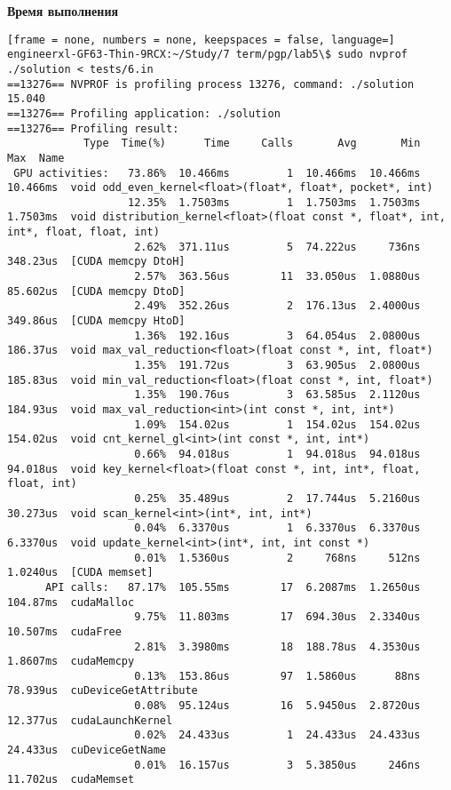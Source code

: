 {\bfseries Время выполнения}
\begin{lstlisting}[frame = none, numbers = none, keepspaces = false, language=]
engineerxl-GF63-Thin-9RCX:~/Study/7 term/pgp/lab5\$ sudo nvprof ./solution < tests/6.in
==13276== NVPROF is profiling process 13276, command: ./solution
15.040
==13276== Profiling application: ./solution
==13276== Profiling result:
            Type  Time(%)      Time     Calls       Avg       Min       Max  Name
 GPU activities:   73.86%  10.466ms         1  10.466ms  10.466ms  10.466ms  void odd_even_kernel<float>(float*, float*, pocket*, int)
                   12.35%  1.7503ms         1  1.7503ms  1.7503ms  1.7503ms  void distribution_kernel<float>(float const *, float*, int, int*, float, float, int)
                    2.62%  371.11us         5  74.222us     736ns  348.23us  [CUDA memcpy DtoH]
                    2.57%  363.56us        11  33.050us  1.0880us  85.602us  [CUDA memcpy DtoD]
                    2.49%  352.26us         2  176.13us  2.4000us  349.86us  [CUDA memcpy HtoD]
                    1.36%  192.16us         3  64.054us  2.0800us  186.37us  void max_val_reduction<float>(float const *, int, float*)
                    1.35%  191.72us         3  63.905us  2.0800us  185.83us  void min_val_reduction<float>(float const *, int, float*)
                    1.35%  190.76us         3  63.585us  2.1120us  184.93us  void max_val_reduction<int>(int const *, int, int*)
                    1.09%  154.02us         1  154.02us  154.02us  154.02us  void cnt_kernel_gl<int>(int const *, int, int*)
                    0.66%  94.018us         1  94.018us  94.018us  94.018us  void key_kernel<float>(float const *, int, int*, float, float, int)
                    0.25%  35.489us         2  17.744us  5.2160us  30.273us  void scan_kernel<int>(int*, int, int*)
                    0.04%  6.3370us         1  6.3370us  6.3370us  6.3370us  void update_kernel<int>(int*, int, int const *)
                    0.01%  1.5360us         2     768ns     512ns  1.0240us  [CUDA memset]
      API calls:   87.17%  105.55ms        17  6.2087ms  1.2650us  104.87ms  cudaMalloc
                    9.75%  11.803ms        17  694.30us  2.3340us  10.507ms  cudaFree
                    2.81%  3.3980ms        18  188.78us  4.3530us  1.8607ms  cudaMemcpy
                    0.13%  153.86us        97  1.5860us      88ns  78.939us  cuDeviceGetAttribute
                    0.08%  95.124us        16  5.9450us  2.8720us  12.377us  cudaLaunchKernel
                    0.02%  24.433us         1  24.433us  24.433us  24.433us  cuDeviceGetName
                    0.01%  16.157us         3  5.3850us     246ns  11.702us  cudaMemset

\end{lstlisting}
